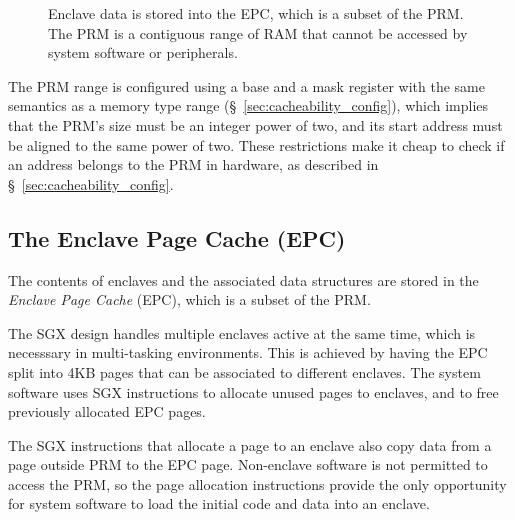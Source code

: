 \begin{figure}[hbt]
  \caption{
    Enclave data is stored into the EPC, which is a subset of the PRM. The
    PRM is a contiguous range of RAM that cannot be accessed by system software
    or peripherals.
  }
  \label{fig:sgx_epc}
\end{figure}

The PRM range is configured using a base and a mask register with the same
semantics as a memory type range (\S~\ref{sec:cacheability_config}), which
implies that the PRM's size must be an integer power of two, and its start
address must be aligned to the same power of two. These restrictions make it
cheap to check if an address belongs to the PRM in hardware, as described in
\S~\ref{sec:cacheability_config}.


\subsection{The Enclave Page Cache (EPC)}
\label{sec:epc}


The contents of enclaves and the associated data structures are stored in the
\textit{Enclave Page Cache} (EPC), which is a subset of the PRM.

The SGX design handles multiple enclaves active at the same time, which is
necesssary in multi-tasking environments. This is achieved by having the EPC
split into 4KB pages that can be associated to different enclaves. The system
software uses SGX instructions to allocate unused pages to enclaves, and to
free previously allocated EPC pages.

The SGX instructions that allocate a page to an enclave also copy data from a
page outside PRM to the EPC page. Non-enclave software is not permitted to
access the PRM, so the page allocation instructions provide the only
opportunity for system software to load the initial code and data into an
enclave.

